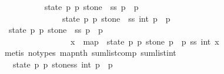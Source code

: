 \begin{isabellebody}
\isanewline
\ \ \ \ \ \ \ \ \isamarkupfalse%
\ {\isachardoublequoteopen}{\isacharparenleft}{\isasymSum}\ {\isacharparenleft}state{\isacharcomma}\ p{}{\isacharcomma}\ p{}{\isacharcomma}\ stone{\isacharparenright}\ {\isasymleftarrow}\ ss{\isachardot}\ p{}\ {\isacharminus}\ p{}{\isacharparenright}\ {\isacharequal}\ \isanewline
\ \ \ \ \ \ \ \ \ \ \ \ \ \ {\isacharparenleft}{\isasymSum}\ {\isacharparenleft}state{\isacharcomma}\ p{}{\isacharcomma}\ p{}{\isacharcomma}\ stone{\isacharparenright}\ {\isasymleftarrow}\ ss{\isachardot}\ int\ {\isacharparenleft}p{}\ {\isacharminus}\ p{}{\isacharparenright}{\isacharparenright}{\isachardoublequoteclose}\isanewline
\ \ \ \ \ \ \ \ \isamarkupfalse%
{\isacharminus}\isanewline
\ \ \ \ \ \ \ \ \ \ \isamarkupfalse%
\ {\isachardoublequoteopen}{\isacharparenleft}{\isasymSum}\ {\isacharparenleft}state{\isacharcomma}\ p{}{\isacharcomma}\ p{}{\isacharcomma}\ stone{\isacharparenright}\ {\isasymleftarrow}\ ss{\isachardot}\ p{}\ {\isacharminus}\ p{}{\isacharparenright}\ {\isacharequal}\ \isanewline
\ \ \ \ \ \ \ \ \ \ \ \ \ \ \ \ {\isacharparenleft}{\isasymSum}\ x\ {\isasymleftarrow}\ map\ {\isacharparenleft}{\isasymlambda}\ {\isacharparenleft}state{\isacharcomma}\ p{}{\isacharcomma}\ p{}{\isacharcomma}\ stone{\isacharparenright}{\isachardot}\ p{}\ {\isacharminus}\ p{}{\isacharparenright}\ ss{\isachardot}\ int\ x{\isacharparenright}{\isachardoublequoteclose}\isanewline
\ \ \ \ \ \ \ \ \ \ \ \ \isamarkupfalse%
\ {\isacharparenleft}metis\ {\isacharparenleft}no{\isacharunderscore}types{\isacharparenright}\ map{\isacharunderscore}nth\ sum{\isacharunderscore}list{\isacharunderscore}comp\ sum{\isacharunderscore}list{\isacharunderscore}int{\isacharparenright}\isanewline
\ \ \ \ \ \ \ \ \ \ \isamarkupfalse%
\ \isamarkupfalse%
\ {\isachardoublequoteopen}{\isachardot}{\isachardot}{\isachardot}\ {\isacharequal}\ {\isacharparenleft}{\isasymSum}{\isacharparenleft}state{\isacharcomma}\ p{}{\isacharcomma}\ p{}{\isacharcomma}\ stone{\isacharparenright}{\isasymleftarrow}ss{\isachardot}\ int\ {\isacharparenleft}p{}\ {\isacharminus}\ p{}{\isacharparenright}{\isacharparenright}{\isachardoublequoteclose}\isanewline
\ \ \ \ \ \ \ \ \ \ \isamarkupfalse%
{\isacharminus}\isanewline
\ \ \ \ \ \ \ \ \ \ \ \ \isamarkupfalse%

\end{isabellebody}
